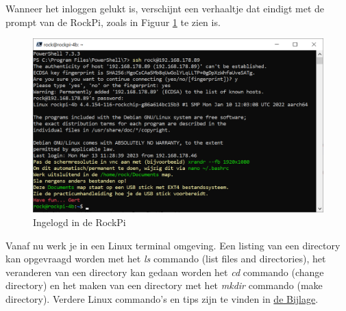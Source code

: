 \clearpage
Wanneer het inloggen gelukt is, verschijnt een verhaaltje dat eindigt met de prompt van de RockPi, zoals in Figuur \ref{fig:rockpiLogIn} te zien is.
\begin{figure}[h!]
	\centering
	\begin{center} 	
		\includegraphics[width=1\textwidth]{figuren/ingelogtRockPi}
		\caption{Ingelogd in de RockPi}
		\label{fig:rockpiLogIn}   
	\end{center}
\end{figure}
Vanaf nu werk je in een Linux terminal omgeving. Een listing van een directory kan opgevraagd worden met het \textit{ls} commando (list files and directories), het veranderen van een directory kan gedaan worden het \textit{cd} commando (change directory) en het maken van een directory met het \textit{mkdir}  commando (make directory). Verdere Linux commando's en tips zijn te vinden in  \hyperlink{LinuxTipsTrics}{de Bijlage}.

\clearpage
